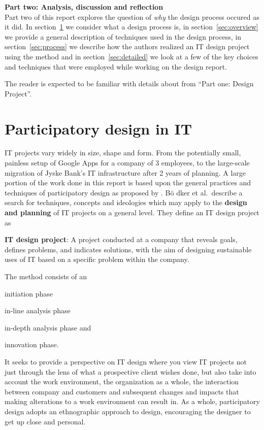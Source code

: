 \setcounter{section}{0}
\setcounter{figure}{0}
\setcounter{table}{0}
\newpage
\textbf{\LARGE{{Part two: Analysis, discussion and reflection}}}\\

Part two of this report explores the question of \textit{why}
the design process occured as it did. In section~\ref{sec:participatory}
we consider what a design process is, in section~\ref{sec:overview}
we provide a general description of techniques used in the design process,
in section~\ref{sec:process} we describe how the authors realized an IT design
project using the \must{} method and in section~\ref{sec:detailed} we
look at a few of the key choices and techniques that were employed while working
on the design report.

The reader is expected to be familiar with details about \gomonkey{} 
from ``Part one: Design Project''.

\section{Participatory design in IT} \label{sec:participatory}
IT projects vary widely in size, shape and form. From the potentially small, painless 
setup of Google Apps for a company of 3 employees, to the large-scale migration of
Jyske Bank's IT infrastructure after 2 years of planning\cite{jyskebank}.
A large portion of the work done in this report is based upon the general
practices and techniques of participatory design as proposed by \cite{bodker2004participatory}.
B\"o dker et al.\ describe a search for techniques, concepts and ideologies which may apply
to the \textbf{design and planning} of IT projects on a general level. They
define an IT design project as
\vspace{5mm}
\begin{framed}
    \textbf{IT design project}: A project conducted at a company that reveals
    goals, defines problems, and indicates solutions, with the aim of designing
    sustainable uses of IT based on a specific problem within the company.
\end{framed}
\vspace{5mm}
The \must{}\cite{bodker2004participatory} method consists of an
\begin{inparaenum}[1)]
    \item initiation phase
    \item in-line analysis phase
    \item in-depth analysis phase and
    \item innovation phase.
\end{inparaenum}
It seeks to provide a perspective on IT design where you view IT projects not
just through the lens of what a prospective client wishes done, but also take into
account the work environment, the organization as a whole, the interaction
between company and customers and subsequent changes and impacts that making
alterations to a work environment can result in. As a whole, participatory
design adopts an ethnographic approach to design, encouraging the designer to
get up close and personal.

